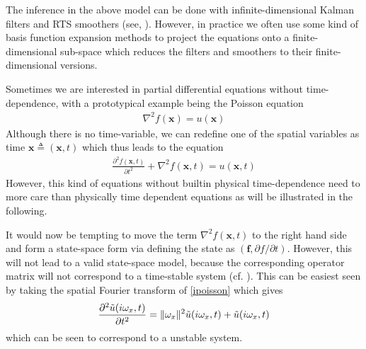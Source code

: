 \documentclass[journal]{IEEEtran}
\begin{document}
The inference in the above model can be done with infinite-dimensional Kalman filters and RTS smoothers (see, \cite{Sarkka+Hartikainen:2012}). However, in practice we often use some kind of basis function expansion methods to project the equations onto a finite-dimensional sub-space which reduces the filters and smoothers to their finite-dimensional versions.

Sometimes we are interested in partial differential equations without time-dependence, with a prototypical example being the Poisson equation
%
\begin{equation}
\begin{split}
  \nabla^2 f(\mathbf{x}) = u(\mathbf{x})
\end{split}
\end{equation}
%
Although there is no time-variable, we can redefine one of the spatial variables as time $\mathbf{x} \triangleq (\mathbf{x},t)$ which thus leads to the equation
%
\begin{equation}
\begin{split}
  \frac{\partial^2 f(\mathbf{x},t)}{\partial t^2} + \nabla^2 f(\mathbf{x},t) = u(\mathbf{x},t)
\end{split}
\label{ipoisson}
\end{equation}
%
However, this kind of equations without builtin physical time-dependence need to more care than physically time dependent equations as will be illustrated in the following.

It would now be tempting to move the term $\nabla^2 f(\mathbf{x},t)$ to the right hand side and form a state-space form via defining the state as $(\mathbf{f},\partial f/\partial t)$. However, this will not lead to a valid state-space model, because the corresponding operator matrix will not correspond to a time-stable system (cf. \cite{Sarkka+Solin+Hartikainen:2013}). This can be easiest seen by taking the spatial Fourier transform of \eqref{ipoisson} which gives
%
\begin{equation}
\begin{split}
  \frac{\partial^2 \tilde{u}(i \boldmath{\omega}_x,t)}{\partial t^2}
  = \| \boldmath{\omega}_x \|^2 \tilde{u}(i \boldmath{\omega}_x,t) + \tilde{u}(i \boldmath{\omega}_x,t)
\end{split}
\end{equation}
%
which can be seen to correspond to a unstable system.
\end{document}
